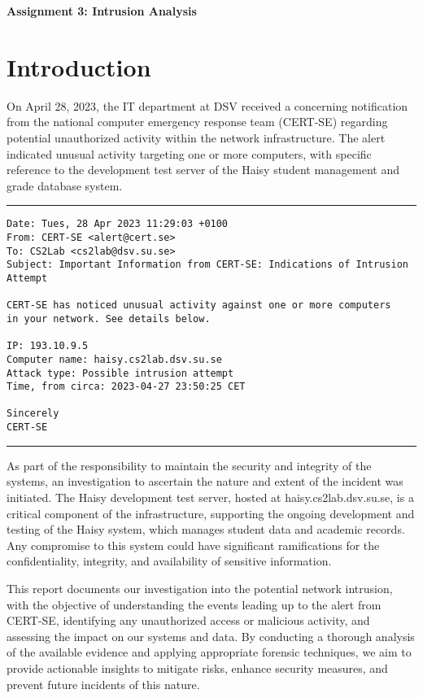 \centerline{\LARGE{\textbf{Assignment 3: Intrusion Analysis}}}
\setcounter{section}{0}
\section{Introduction}
On April 28, 2023, the IT department at DSV received a concerning notification from the national computer emergency response team (CERT-SE) regarding potential unauthorized activity within the network infrastructure. The alert indicated unusual activity targeting one or more computers, with specific reference to the development test server of the Haisy student management and grade database system. 

\noindent\rule{\textwidth}{1pt}
\vspace{-0.8cm}
\begin{verbatim}
Date: Tues, 28 Apr 2023 11:29:03 +0100
From: CERT-SE <alert@cert.se>
To: CS2Lab <cs2lab@dsv.su.se>
Subject: Important Information from CERT-SE: Indications of Intrusion Attempt

CERT-SE has noticed unusual activity against one or more computers
in your network. See details below.

IP: 193.10.9.5
Computer name: haisy.cs2lab.dsv.su.se
Attack type: Possible intrusion attempt
Time, from circa: 2023-04-27 23:50:25 CET

Sincerely
CERT-SE	
\end{verbatim}
\vspace{-0.5cm}
\noindent\rule{\textwidth}{1pt}
\vspace{0cm}

\noindent As part of the responsibility to maintain the security and integrity of the systems, an investigation to ascertain the nature and extent of the incident was initiated. The Haisy development test server, hosted at haisy.cs2lab.dsv.su.se, is a critical component of the infrastructure, supporting the ongoing development and testing of the Haisy system, which manages student data and academic records. Any compromise to this system could have significant ramifications for the confidentiality, integrity, and availability of sensitive information.
\newline

\noindent This report documents our investigation into the potential network intrusion, with the objective of understanding the events leading up to the alert from CERT-SE, identifying any unauthorized access or malicious activity, and assessing the impact on our systems and data. By conducting a thorough analysis of the available evidence and applying appropriate forensic techniques, we aim to provide actionable insights to mitigate risks, enhance security measures, and prevent future incidents of this nature.
\newpage
